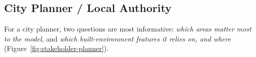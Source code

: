 \subsection{City Planner / Local Authority}
For a city planner, two questions are most informative: \emph{which areas matter most to the
model}, and \emph{which built-environment features it relies on, and where}
(Figure~\ref{fig:stakeholder-planner}).\par\medskip
%
%


